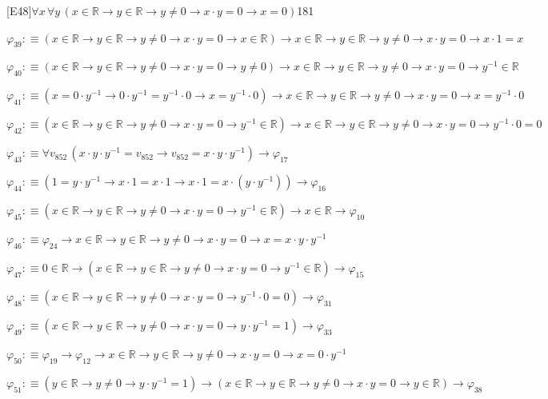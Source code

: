\begin{fullproof}{[E48]}{$\forall x\,\forall y\,(x \in \mathbb{R} \to y \in \mathbb{R} \to y \neq 0 \to x \cdot y = 0 \to x = 0)$}{181}
\begin{abbrevlist}
\item $\varphi_{39} :\equiv (x \in \mathbb{R} \to y \in \mathbb{R} \to y \neq 0 \to x \cdot y = 0 \to x \in \mathbb{R}) \to x \in \mathbb{R} \to y \in \mathbb{R} \to y \neq 0 \to x \cdot y = 0 \to x \cdot 1 = x$
\item $\varphi_{40} :\equiv (x \in \mathbb{R} \to y \in \mathbb{R} \to y \neq 0 \to x \cdot y = 0 \to y \neq 0) \to x \in \mathbb{R} \to y \in \mathbb{R} \to y \neq 0 \to x \cdot y = 0 \to y^{-1} \in \mathbb{R}$
\item $\varphi_{41} :\equiv (x = 0 \cdot y^{-1} \to 0 \cdot y^{-1} = y^{-1} \cdot 0 \to x = y^{-1} \cdot 0) \to x \in \mathbb{R} \to y \in \mathbb{R} \to y \neq 0 \to x \cdot y = 0 \to x = y^{-1} \cdot 0$
\item $\varphi_{42} :\equiv (x \in \mathbb{R} \to y \in \mathbb{R} \to y \neq 0 \to x \cdot y = 0 \to y^{-1} \in \mathbb{R}) \to x \in \mathbb{R} \to y \in \mathbb{R} \to y \neq 0 \to x \cdot y = 0 \to y^{-1} \cdot 0 = 0$
\item $\varphi_{43} :\equiv \forall v_{852}\,(x \cdot y \cdot y^{-1} = v_{852} \to v_{852} = x \cdot y \cdot y^{-1}) \to \varphi_{17}$
\item $\varphi_{44} :\equiv (1 = y \cdot y^{-1} \to x \cdot 1 = x \cdot 1 \to x \cdot 1 = x \cdot (y \cdot y^{-1})) \to \varphi_{16}$
\item $\varphi_{45} :\equiv (x \in \mathbb{R} \to y \in \mathbb{R} \to y \neq 0 \to x \cdot y = 0 \to y^{-1} \in \mathbb{R}) \to x \in \mathbb{R} \to \varphi_{10}$
\item $\varphi_{46} :\equiv \varphi_{24} \to x \in \mathbb{R} \to y \in \mathbb{R} \to y \neq 0 \to x \cdot y = 0 \to x = x \cdot y \cdot y^{-1}$
\item $\varphi_{47} :\equiv 0 \in \mathbb{R} \to (x \in \mathbb{R} \to y \in \mathbb{R} \to y \neq 0 \to x \cdot y = 0 \to y^{-1} \in \mathbb{R}) \to \varphi_{15}$
\item $\varphi_{48} :\equiv (x \in \mathbb{R} \to y \in \mathbb{R} \to y \neq 0 \to x \cdot y = 0 \to y^{-1} \cdot 0 = 0) \to \varphi_{31}$
\item $\varphi_{49} :\equiv (x \in \mathbb{R} \to y \in \mathbb{R} \to y \neq 0 \to x \cdot y = 0 \to y \cdot y^{-1} = 1) \to \varphi_{33}$
\item $\varphi_{50} :\equiv \varphi_{19} \to \varphi_{12} \to x \in \mathbb{R} \to y \in \mathbb{R} \to y \neq 0 \to x \cdot y = 0 \to x = 0 \cdot y^{-1}$
\item $\varphi_{51} :\equiv (y \in \mathbb{R} \to y \neq 0 \to y \cdot y^{-1} = 1) \to (x \in \mathbb{R} \to y \in \mathbb{R} \to y \neq 0 \to x \cdot y = 0 \to y \in \mathbb{R}) \to \varphi_{38}$

\end{abbrevlist}
\end{fullproof}
